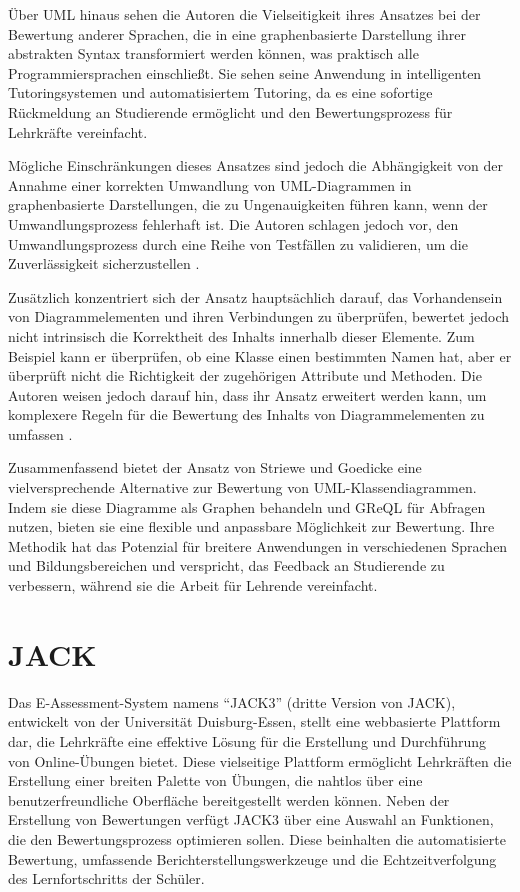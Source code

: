 Über UML hinaus sehen die Autoren die Vielseitigkeit ihres Ansatzes bei der Bewertung anderer Sprachen, die in eine graphenbasierte Darstellung ihrer abstrakten Syntax transformiert werden können, was praktisch alle Programmiersprachen einschließt. Sie sehen seine Anwendung in intelligenten Tutoringsystemen und automatisiertem Tutoring, da es eine sofortige Rückmeldung an Studierende ermöglicht und den Bewertungsprozess für Lehrkräfte vereinfacht.

Mögliche Einschränkungen dieses Ansatzes sind jedoch die Abhängigkeit von der Annahme einer korrekten Umwandlung von UML-Diagrammen in graphenbasierte Darstellungen, die zu Ungenauigkeiten führen kann, wenn der Umwandlungsprozess fehlerhaft ist. Die Autoren schlagen jedoch vor, den Umwandlungsprozess durch eine Reihe von Testfällen zu validieren, um die Zuverlässigkeit sicherzustellen \cite{striewe2011automated}.

Zusätzlich konzentriert sich der Ansatz hauptsächlich darauf, das Vorhandensein von Diagrammelementen und ihren Verbindungen zu überprüfen, bewertet jedoch nicht intrinsisch die Korrektheit des Inhalts innerhalb dieser Elemente. Zum Beispiel kann er überprüfen, ob eine Klasse einen bestimmten Namen hat, aber er überprüft nicht die Richtigkeit der zugehörigen Attribute und Methoden. Die Autoren weisen jedoch darauf hin, dass ihr Ansatz erweitert werden kann, um komplexere Regeln für die Bewertung des Inhalts von Diagrammelementen zu umfassen \cite{striewe2014automated}.

Zusammenfassend bietet der Ansatz von Striewe und Goedicke eine vielversprechende Alternative zur Bewertung von UML-Klassendiagrammen. Indem sie diese Diagramme als Graphen behandeln und \ac{GReQL} für Abfragen nutzen, bieten sie eine flexible und anpassbare Möglichkeit zur Bewertung. Ihre Methodik hat das Potenzial für breitere Anwendungen in verschiedenen Sprachen und Bildungsbereichen und verspricht, das Feedback an Studierende zu verbessern, während sie die Arbeit für Lehrende vereinfacht.


\section{JACK}

Das E-Assessment-System namens ``JACK3'' (dritte Version von JACK)\cite{jack}, entwickelt von der Universität
Duisburg-Essen, stellt eine webbasierte Plattform dar, die Lehrkräfte eine effektive Lösung für die Erstellung und
Durchführung von Online-Übungen bietet. Diese vielseitige Plattform ermöglicht Lehrkräften die Erstellung einer breiten
Palette von Übungen, die nahtlos über eine benutzerfreundliche Oberfläche bereitgestellt werden können. Neben der
Erstellung von Bewertungen verfügt JACK3 über eine Auswahl an Funktionen, die den Bewertungsprozess optimieren sollen.
Diese beinhalten die automatisierte Bewertung, umfassende Berichterstellungswerkzeuge und die Echtzeitverfolgung des
Lernfortschritts der Schüler.

